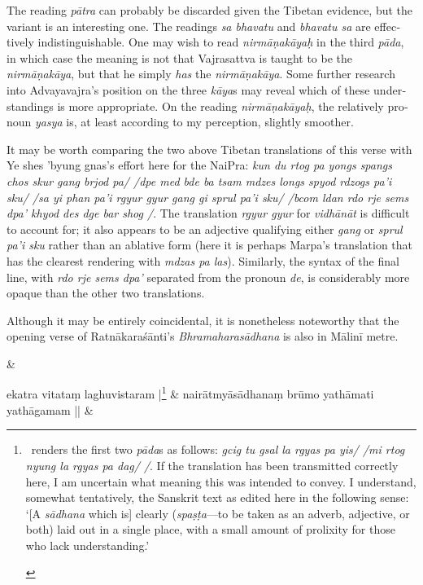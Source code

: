 \documentclass[naipra.tex]{subfiles}
\begin{document}
\begin{sanskrit}
{\begin{english}
		The reading \emph{pātra} can probably be discarded given the Tibetan evidence, but the variant is an interesting one.
		The readings \emph{sa bhavatu} and \emph{bhavatu sa} are effectively indistinguishable.
		One may wish to read \emph{nirmāṇakāyaḥ} in the third \emph{pāda}, in which case the meaning is not that Vajrasattva is taught to be the \emph{nirmāṇakāya}, but that he simply \emph{has} the \emph{nirmāṇakāya}.
		Some further research into Advayavajra's position on the three \emph{kāya}s may reveal which of these understandings is more appropriate.
		On the reading \emph{nirmāṇakāyaḥ}, the relatively pronoun \emph{yasya} is, at least according to my perception, slightly smoother.

		It may be worth comparing the two above Tibetan translations of this verse with Ye shes 'byung gnas's effort here for the NaiPra: \emph{kun du rtog pa yongs spangs chos skur gang brjod pa/ /dpe med bde ba tsam mdzes longs spyod rdzogs pa'i sku/ /sa yi phan pa'i rgyur gyur gang gi sprul pa'i sku/ /bcom ldan rdo rje sems dpa' khyod des dge bar shog /}. 
		The translation \emph{rgyur gyur} for \emph{vidhānāt} is difficult to account for; it also appears to be an adjective qualifying either \emph{gang} or \emph{sprul pa'i sku} rather than an ablative form (here it is perhaps Marpa's translation that has the clearest rendering with \emph{mdzas pa las}).
		Similarly, the syntax of the final line, with \emph{rdo rje sems dpa'} separated from the pronoun \emph{de}, is considerably more opaque than the other two translations.

		Although it may be entirely coincidental, it is nonetheless noteworthy that the opening verse of Ratnākaraśānti's \emph{Bhramaharasādhana} is also in Mālinī metre.
	\end{english}
} \&



\medskip\versequote
ekatra vitataṃ laghuvistaram |\footnote{
	\begin{english}%
		\TIB\ renders the first two \emph{pāda}s as follows: \emph{gcig tu gsal la rgyas pa yis/ /mi rtog nyung la rgyas pa dag/ /}.
		If the translation has been transmitted correctly here, I am uncertain what meaning this was intended to convey. 
		I understand, somewhat tentatively, the Sanskrit text as edited here in the following sense: `[A \emph{sādhana} which is] clearly (\emph{spaṣṭa}—to be taken as an adverb, adjective, or both) laid out in a single place, with a small amount of prolixity for those who lack understanding.'
	\end{english}
} & 
nairātmyāsādhanaṃ brūmo yathāmati yathāgamam || \&


\end{sanskrit}
\end{document}

